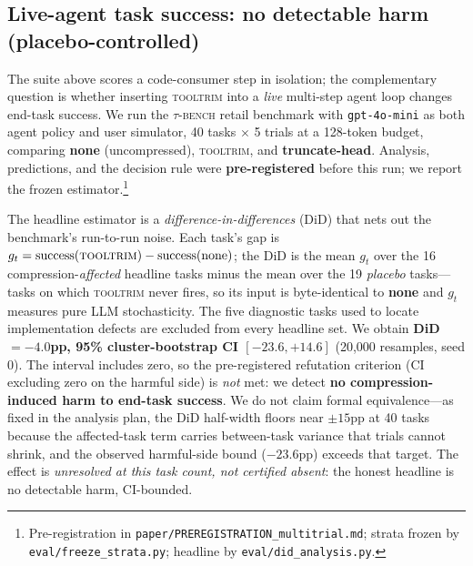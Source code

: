\documentclass[11pt]{article}
\newcommand{\tooltrim}{\textsc{tooltrim}}
\begin{document}
\subsection{Live-agent task success: no detectable harm (placebo-controlled)}
\label{sec:taubench}
The suite above scores a code-consumer step in isolation; the complementary
question is whether inserting \tooltrim{} into a \emph{live} multi-step agent loop
changes end-task success. We run the \textsc{$\tau$-bench} retail benchmark with
\texttt{gpt-4o-mini} as both agent policy and user simulator, 40 tasks $\times$ 5
trials at a 128-token budget, comparing \textbf{none} (uncompressed),
\tooltrim{}, and \textbf{truncate-head}. Analysis, predictions, and the decision
rule were \textbf{pre-registered} before this run; we report the frozen
estimator.\footnote{Pre-registration in
\texttt{paper/PREREGISTRATION\_multitrial.md}; strata frozen by
\texttt{eval/freeze\_strata.py}; headline by \texttt{eval/did\_analysis.py}.}

The headline estimator is a \emph{difference-in-differences} (DiD) that nets out
the benchmark's run-to-run noise. Each task's gap is $g_t=\text{success}(\tooltrim)-\text{success}(\text{none})$;
the DiD is the mean $g_t$ over the 16 compression-\emph{affected} headline tasks
minus the mean over the 19 \emph{placebo} tasks---tasks on which \tooltrim{} never
fires, so its input is byte-identical to \textbf{none} and $g_t$ measures pure LLM
stochasticity. The five diagnostic tasks used to locate implementation defects are
excluded from every headline set. We obtain
\textbf{DiD $=-4.0$pp, 95\% cluster-bootstrap CI $[-23.6,+14.6]$} (20{,}000
resamples, seed 0). The interval includes zero, so the pre-registered refutation
criterion (CI excluding zero on the harmful side) is \emph{not} met: we detect
\textbf{no compression-induced harm to end-task success}. We do not claim formal
equivalence---as fixed in the analysis plan, the DiD half-width floors near
$\pm15$pp at 40 tasks because the affected-task term carries between-task variance
that trials cannot shrink, and the observed harmful-side bound ($-23.6$pp) exceeds
that target. The effect is \emph{unresolved at this task count, not certified
absent}: the honest headline is no detectable harm, CI-bounded.
\end{document}
